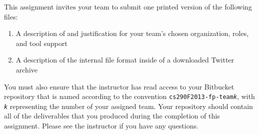 This assignment invites your team to submit one printed version of the following files:
\vspace*{-.1in}
\begin{enumerate}
	\itemsep0em 
	\item A description of and justification for your team's chosen organization, roles, and tool support
	\item A description of the internal file format inside of a downloaded Twitter archive

\end{enumerate}
\vspace*{-.1in}

You must also ensure that the instructor has read access to your Bitbucket repository that is named according to the
convention {\tt cs290F2013-fp-team{\em k}}, with {\tt {\em k}} representing the number of your assigned team.  Your
repository should contain all of the deliverables that you produced during the completion of this assignment.  Please
see the instructor if you have any questions. 
 


